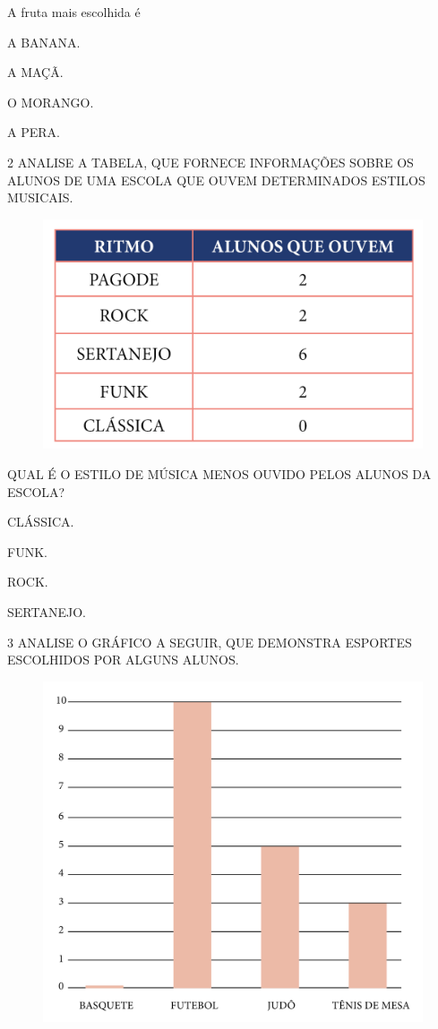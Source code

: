 A fruta mais escolhida é

\begin{escolha}
\item A BANANA.

\item A MAÇÃ.

\item O MORANGO.

\item A PERA.
\end{escolha}

\num{2} ANALISE A TABELA, QUE FORNECE INFORMAÇÕES SOBRE OS ALUNOS DE UMA ESCOLA QUE OUVEM DETERMINADOS ESTILOS MUSICAIS.

\begin{figure}[htpb!]
\centering
\includegraphics[width=.5\textwidth]{../ilustracoes/MAT1/SAEB_1ANO_MAT_FIGURA110.png}
\end{figure}

\pagebreak
QUAL É O ESTILO DE MÚSICA MENOS OUVIDO PELOS ALUNOS DA ESCOLA?

\begin{escolha}
\item CLÁSSICA.

\item FUNK.

\item ROCK.

\item SERTANEJO.
\end{escolha}

\num{3} ANALISE O GRÁFICO A SEGUIR, QUE DEMONSTRA ESPORTES ESCOLHIDOS POR ALGUNS ALUNOS.

\begin{figure}[htpb!]
\centering
\includegraphics[width=.8\textwidth]{../ilustracoes/MAT1/SAEB_1ANO_MAT_FIGURA111.png}
\end{figure}

